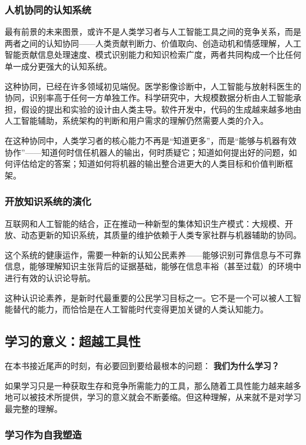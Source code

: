 \documentclass[11pt]{article}
\begin{document}
\subsubsection{人机协同的认知系统}
\label{sec:orgc1f5cd6}

最有前景的未来图景，或许不是人类学习者与人工智能工具之间的竞争关系，而是两者之间的认知协同——人类贡献判断力、价值取向、创造动机和情感理解，人工智能贡献信息处理速度、模式识别能力和知识检索广度，两者共同构成一个比任何单一成分更强大的认知系统。

这种协同，已经在许多领域初见端倪。医学影像诊断中，人工智能与放射科医生的协同，识别率高于任何一方单独工作。科学研究中，大规模数据分析由人工智能承担，假设的提出和实验的设计由人类主导。软件开发中，代码的生成越来越多地由人工智能辅助，系统架构的判断和用户需求的理解仍然需要人类的介入。

在这种协同中，人类学习者的核心能力不再是“知道更多”，而是“能够与机器有效协作”——知道何时信任机器人的输出，何时质疑它；知道如何提出好的问题，如何评估给定的答案；知道如何将机器的输出整合进更大的人类目标和价值判断框架。
\subsubsection{开放知识系统的演化}
\label{sec:orgd2de49e}

互联网和人工智能的结合，正在推动一种新型的集体知识生产模式：大规模、开放、动态更新的知识系统，其质量的维护依赖于人类专家社群与机器辅助的协同。

这个系统的健康运作，需要一种新的认知公民素养——能够识别可靠信息与不可靠信息，能够理解知识主张背后的证据基础，能够在信息丰裕（甚至过载）的环境中进行有效的认识论导航。

这种认识论素养，是新时代最重要的公民学习目标之一。它不是一个可以被人工智能替代的能力，而恰恰是在人工智能时代变得更加关键的人类认知能力。
\subsection{学习的意义：超越工具性}
\label{sec:orgd90bad4}

在本书接近尾声的时刻，有必要回到要给最根本的问题： \textbf{我们为什么学习？}

如果学习只是一种获取生存和竞争所需能力的工具，那么随着工具性能力越来越多地可以被技术所提供，学习的意义就会不断萎缩。但这种理解，从来就不是对学习最完整的理解。
\subsubsection{学习作为自我塑造}
\label{sec:org74c45fc}
\end{document}
